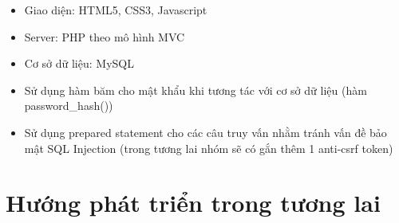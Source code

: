 \documentclass{article}
\begin{document}
\begin{itemize}
\item Giao diện: HTML5, CSS3, Javascript
\item Server: PHP theo mô hình MVC
\item Cơ sở dữ liệu: MySQL
\item Sử dụng hàm băm cho mật khẩu khi tương tác với cơ sở dữ liệu (hàm password\_hash()) 
\item Sử dụng prepared statement cho các câu truy vấn nhằm tránh vấn đề bảo mật SQL Injection (trong tương lai nhóm sẽ có gắn thêm 1 anti-csrf token)
\end{itemize}

\section*{Hướng phát triển trong tương lai}
\end{document}
